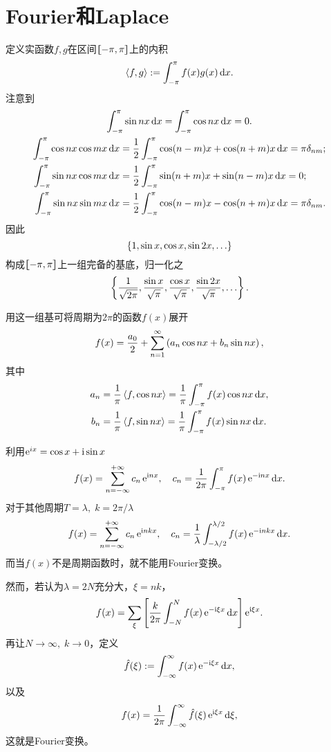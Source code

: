\section{Fourier和Laplace}
定义实函数$f,g$在区间$\lfloor\hspace{-4.7 pt}\lceil -\pi,\pi\rceil\hspace{-4.7 pt}\rfloor$上的内积
\[\left\langle f,g\right\rangle:=\int_{-\pi}^\pi f(x)g(x)\mathop{}\!\mathrm{d} x.\]
注意到
\begin{gather*}
	\int_{-\pi}^\pi\sin nx\d x=\int_{-\pi}^\pi\cos nx\d x=0.\\
	\begin{aligned}
		\int_{-\pi}^\pi\cos nx\cos mx\d x & =\frac12\int_{-\pi}^\pi\cos(n-m)x+\cos(n+m)x\d x=\pi\delta_{nm};\\
		\int_{-\pi}^\pi\sin nx\cos mx\d x & =\frac12\int_{-\pi}^\pi\sin(n+m)x+\sin(n-m)x\d x=0; \\             
		\int_{-\pi}^\pi\sin nx\sin mx\d x & =\frac12\int_{-\pi}^\pi\cos(n-m)x-\cos(n+m)x\d x=\pi\delta_{nm} .
	\end{aligned}
\end{gather*}
因此
\[\left\{1,\sin x,\cos x,\sin2x,\ldots\right\}\]
构成$\lfloor\hspace{-4.7 pt}\lceil -\pi,\pi\rceil\hspace{-4.7 pt}\rfloor$上一组完备的基底，归一化之
\[\left\{\frac1{\sqrt{2\pi}},\frac{\sin x}{\sqrt\pi},\frac{\cos x}{\sqrt\pi},\frac{\sin2x}{\sqrt\pi},\ldots\right\}.\]

用这一组基可将周期为$2\pi$的函数$f(x)$展开
\[f(x)=\frac{a_0}2+\sum_{n=1}^\infty\left(a_n\cos nx+b_n\sin nx\right),\]
其中
\begin{align*}
	a_n & =\frac1\pi\left\langle f,\cos nx\right\rangle=\frac1\pi\int_{-\pi}^\pi f(x)\cos nx\mathop{}\!\mathrm{d} x, \\
	b_n & =\frac1\pi\left\langle f,\sin nx\right\rangle=\frac1\pi\int_{-\pi}^\pi f(x)\sin nx\mathop{}\!\mathrm{d} x.
\end{align*}

利用$\mathop{}\!\mathrm{e}^{ix}=\cos x+\mathrm{i}\sin x$
\[f(x)=\sum_{n=-\infty}^{+\infty}c_n\mathop{}\!\mathrm{e}^{\mathrm{i} nx},\quad c_n=\frac1{2\pi}\int_{-\pi}^\pi f(x)\mathop{}\!\mathrm{e}^{-\mathrm{i} nx}\mathop{}\!\mathrm{d} x.\]
对于其他周期$T=\lambda,\;k=2\pi/\lambda$
\[f(x)=\sum_{n=-\infty}^{+\infty}c_n\mathop{}\!\mathrm{e}^{\mathrm{i} nkx},\quad c_n=\frac1\lambda\int_{-\lambda/2}^{\lambda/2} f(x)\mathop{}\!\mathrm{e}^{-\mathrm{i} nkx}\mathop{}\!\mathrm{d} x.\]
而当$f(x)$不是周期函数时，就不能用Fourier变换。

然而，若认为$\lambda=2N$充分大，$\xi=nk$，
\[f(x)=\sum_\xi\left[\frac{k}{2\pi}\int_{-N}^Nf(x)\mathop{}\!\mathrm{e}^{-\mathrm{i}\xi x}\mathop{}\!\mathrm{d} x\right]\mathop{}\!\mathrm{e}^{\mathrm{i}\xi x}.\]
再让$N\to\infty,\;k\to0$，定义
\[\hat f(\xi):=\int_{-\infty}^\infty f(x)\mathop{}\!\mathrm{e}^{-\mathrm{i}\xi x}\mathop{}\!\mathrm{d} x,\]
以及
\[f(x)=\frac1{2\pi}\int_{-\infty}^\infty\hat f(\xi)\mathop{}\!\mathrm{e}^{\mathrm{i}\xi x}\mathop{}\!\mathrm{d}\xi,\]
这就是Fourier变换。
